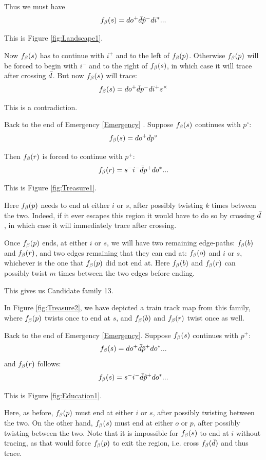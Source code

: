 Thus we must have
\[
f_\beta(s) = d o^+ \bar{d} \hat{p}^- d i^*...
\]

This is Figure \ref{fig:Landscape1}.

Now $f_\beta(s)$ has to continue with $i^+$ and to the left of $f_\beta(p)$. Otherwise $f_\beta(p)$ will be forced to begin with $i^-$ and to the right of $f_\beta(s)$, in which case it will trace after crossing $\bar{d}$. But now $f_\beta(s)$ will trace:
\[
f_\beta(s) = d o^+ \bar{d} p^- d i^+ s^\times
\]

This is a contradiction.

\label{Treasure}
Back to the end of Emergency \ref{Emergency}
. Suppose $f_\beta(s)$ continues with $p^\circ$:
\[
f_\beta(s) = d o^+ \bar{d} p^\circ
\]

Then $f_\beta(r)$ is forced to continue with $p^+$:
\[
f_\beta(r) = s^- i^- \bar{d} p^+ d o^*...
\]

This is Figure \ref{fig:Treasure1}.

Here $f_\beta(p)$ needs to end at either $i$ or $s$, after possibly twisting $k$ times between the two. Indeed, if it ever escapes this region it would have to do so by crossing $\bar{d}$, in which case it will immediately trace after crossing. 

Once $f_\beta(p)$ ends, at either $i$ or $s$, we will have two remaining edge-paths: $f_\beta(b)$ and $f_\beta(r)$, and two edges remaining that they can end at: $f_\beta(o)$ and $i$ or $s$, whichever is the one that $f_\beta(p)$ did not end at. Here $f_\beta(b)$ and $f_\beta(r)$ can possibly twist $m$ times between the two edges before ending. 


This gives us Candidate family 13.

In Figure \ref{fig:Treasure2}, we have depicted a train track map from this family, where $f_\beta(p)$ twists once to end at $s$, and $f_\beta(b)$ and $f_\beta(r)$ twist once as well.

\label{Education}
Back to the end of Emergency \ref{Emergency}. Suppose $f_\beta(s)$ continues with $p^+$:
\[
f_\beta(s) = d o^+ \bar{d} \hat{p}^+ d o^*...
\]
and $f_\beta(r)$ follows:
\[
f_\beta(s) = s^- i^- \bar{d} \hat{p}^+ d o^*...
\]

This is Figure \ref{fig:Education1}.

Here, as before, $f_\beta(p)$ must end at either $i$ or $s$, after possibly twisting between the two. On the other hand, $f_\beta(s)$ must end at either $o$ or $p$, after possibly twisting between the two. Note that it is impossible for $f_\beta(s)$ to end at $i$ without tracing, as that would force $f_\beta(p)$ to exit the region, i.e. cross $f_\beta(\bar{d})$ and thus trace. 


